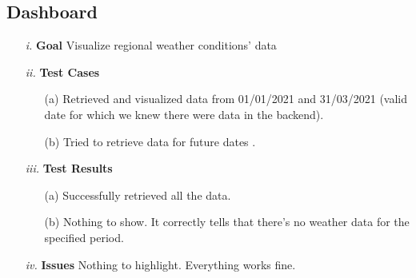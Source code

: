 \documentclass[table, 12pt]{article}
\begin{document}
\subsection{Dashboard}
\begin{itemize}
    \item[\textit{i.}] \textbf{Goal} Visualize regional weather conditions' data
    \item[\textit{ii.}] \textbf{Test Cases}
    \begin{itemize}
        \item[(a)] Retrieved and visualized data from 01/01/2021 and 31/03/2021 (valid date for which we knew there were data in the backend).
        \item[(b)] Tried to retrieve data for future dates .
    \end{itemize}
    \item[\textit{iii.}] \textbf{Test Results}
    \begin{itemize}
        \item[(a)] Successfully retrieved all the data.
        \item[(b)] Nothing to show. It correctly tells that there's no weather data for the specified period.  
    \end{itemize} 
    \item[\textit{iv.}] \textbf{Issues}  Nothing to highlight. Everything works fine. 
\end{itemize}
\end{document}
